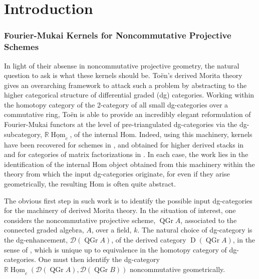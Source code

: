 \chapter*{Introduction}
\subsection*{Fourier-Mukai Kernels for Noncommutative Projective Schemes}

In light of their absense in noncommutative projective geometry, the natural question to ask is what these kernels should be.
To\"en's derived Morita theory \parencite{Toen07} gives an overarching framework to attack such a problem by abstracting to the higher categorical structure of differential graded (dg) categories.
Working within the homotopy category of the 2-category of all small dg-categories over a commutative ring, To\"en is able to provide an incredibly elegant reformulation of Fourier-Mukai functors at the level of pre-triangulated dg-categories via the dg-subcategory, \(\mathbb{R}\underline{\operatorname{Hom}}_c\), of the internal Hom.
Indeed, using this machinery, kernels have been recovered for schemes in \parencite{Toen07}, and obtained for higher derived stacks in \parencite{BFN10} and for categories of matrix factorizations in \parencite{Dyckerhoff11,PV12,BFK14}.
In each case, the work lies in the identification of the internal Hom object obtained from this machinery within the theory from which the input dg-categories originate, for even if they arise geometrically, the resulting Hom is often quite abstract.

The obvious first step in such work is to identify the possible input dg-categories for the machinery of derived Morita theory.
In the situation of interest, one considers the noncommutative projective scheme, \(\operatorname{QGr} A\), associated to the connected graded algebra, \(A\), over a field, \(k\). 
The natural choice of dg-category is the dg-enhancement, \(\mathcal{D}(\operatorname{QGr} A)\), of the derived category \(\operatorname{D}(\operatorname{QGr} A)\), in the sense of \parencite{Lunts-Orlov}, which is unique up to equivalence in the homotopy category of dg-categories.
One must then identify the dg-category \(\mathbb{R}\underline{\operatorname{Hom}}_c(\mathcal{D}(\operatorname{QGr} A), \mathcal{D}(\operatorname{QGr} B))\) noncommutative geometrically.

